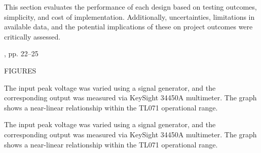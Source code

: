 This section evaluates the performance of each design based on testing outcomes, simplicity, and cost of implementation. Additionally, uncertainties, limitations in available data, and the potential implications of these on project outcomes were critically assessed.







, pp. 22--25





FIGURES

The input peak voltage was varied using a signal generator, and the corresponding output was measured via KeySight 34450A multimeter. The graph shows a near-linear relationship within the TL071 operational range.


 The input peak voltage was varied using a signal generator, and the corresponding output was measured via KeySight 34450A multimeter. The graph shows a near-linear relationship within the TL071 operational range.
